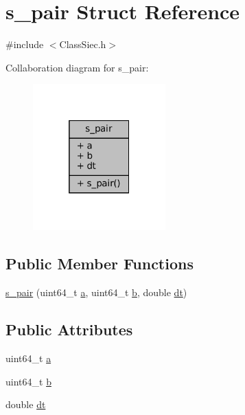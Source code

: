 \hypertarget{structs__pair}{}\section{s\+\_\+pair Struct Reference}
\label{structs__pair}


{\ttfamily \#include $<$Class\+Siec.\+h$>$}



Collaboration diagram for s\+\_\+pair\+:\nopagebreak
\begin{figure}[H]
\begin{center}
\leavevmode
\includegraphics[width=145pt]{structs__pair__coll__graph}
\end{center}
\end{figure}
\subsection*{Public Member Functions}
\begin{DoxyCompactItemize}
\item 
\mbox{\hyperlink{structs__pair_aee9b5834540a69b1f920276f9f069715}{s\+\_\+pair}} (uint64\+\_\+t \mbox{\hyperlink{structs__pair_aa255b01b871f0a9d8236717b13c4c167}{a}}, uint64\+\_\+t \mbox{\hyperlink{structs__pair_a4b452c86a4f4005ef2781e0324a50dda}{b}}, double \mbox{\hyperlink{structs__pair_a6da5de6a04996b5b5c26be868da76900}{dt}})
\end{DoxyCompactItemize}
\subsection*{Public Attributes}
\begin{DoxyCompactItemize}
\item 
uint64\+\_\+t \mbox{\hyperlink{structs__pair_aa255b01b871f0a9d8236717b13c4c167}{a}}
\item 
uint64\+\_\+t \mbox{\hyperlink{structs__pair_a4b452c86a4f4005ef2781e0324a50dda}{b}}
\item 
double \mbox{\hyperlink{structs__pair_a6da5de6a04996b5b5c26be868da76900}{dt}}
\end{DoxyCompactItemize}


